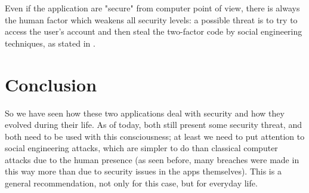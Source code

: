 \documentclass{article}
\begin{document}
Even if the application are "secure" from computer point of view, there is always the human factor which weakens all security levels: a possible threat is to try to access the user's account and then steal the two-factor code by social engineering techniques, as stated in \cite{6digits_hack}.


\section{Conclusion}

So we have seen how these two applications deal with security and how they evolved during their life. As of today, both still present some security threat, and both need to be used with this consciousness; at least we need to put attention to social engineering attacks, which are simpler to do than classical computer attacks due to the human presence (as seen before, many breaches were made in this way more than due to security issues in the apps themselves). This is a general recommendation, not only for this case, but for everyday life.






\end{document}
